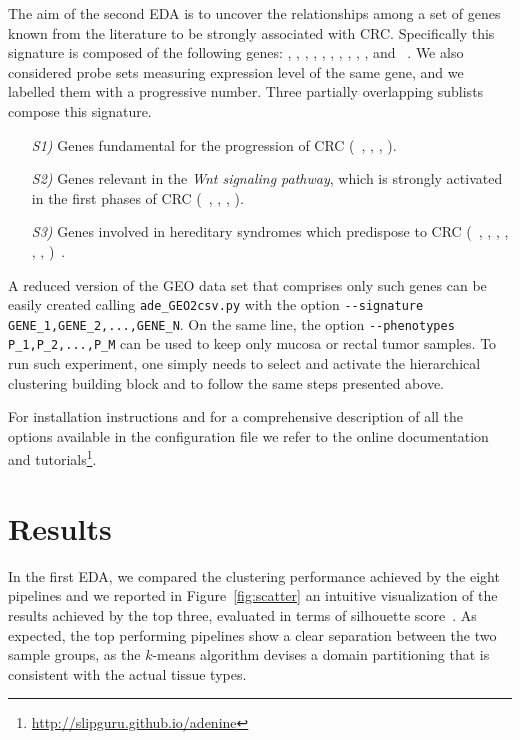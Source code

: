The aim of the second EDA is to uncover the relationships among a set of genes known from the literature to be strongly associated with CRC. Specifically this signature is composed of the following genes: \apc, \kras, \ctnnb, \tp, \msh, \mlh, \pms, \pten, \smad, \stk, \gsk and \axin~\cite{schulz2005molecular}.
We also considered probe sets measuring expression level of the same gene, and we labelled them with a progressive number.
Three partially overlapping sublists compose this signature.
\begin{enumerate}
  \item[\emph{S1)}] Genes fundamental for the progression of CRC (\ie~\apc, \kras, \ctnnb, \tp).
  \item[\emph{S2)}] Genes relevant in the \textit{Wnt signaling pathway}, which is strongly activated in the first phases of CRC (\ie~\apc, \ctnnb, \gsk, \axin).
  \item[\emph{S3)}] Genes involved in hereditary syndromes which predispose to CRC (\ie~\apc, \msh, \mlh, \pms, \pten, \smad, \stk)~\cite{schulz2005molecular}.
\end{enumerate}

A reduced version of the GEO data set that comprises only such genes can be easily created calling \texttt{{\footnotesize ade\_GEO2csv.py}} with the option \texttt{{\footnotesize -{}-signature GENE\_1,GENE\_2,...,GENE\_N}}. On the same line, the option \texttt{{\footnotesize -{}-phenotypes P\_1,P\_2,...,P\_M}} can be used to keep only mucosa or rectal tumor samples.
To run such experiment, one simply needs to select and activate the hierarchical clustering building block and to follow the same steps presented above.


For \ade installation instructions and for a comprehensive description of all the options available in the configuration file we refer to the online documentation and tutorials\footnote{\url{http://slipguru.github.io/adenine}}.

\section{Results} \label{sec:results}

In the first EDA, we compared the clustering performance achieved by the eight \ade pipelines and we reported in Figure~\ref{fig:scatter} an intuitive visualization of the results achieved by the top three, evaluated in terms of silhouette score~\cite{rousseeuw1987silhouettes}. As expected, the top performing pipelines show a clear separation between the two sample groups, as the $k$-means algorithm devises a domain partitioning that is consistent with the actual tissue types.

